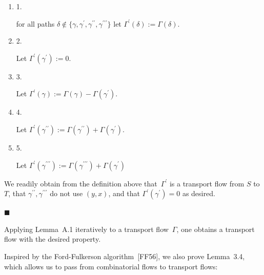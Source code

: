 \documentclass[10pt,a4paper]{article}
\begin{document}
\begin{enumerate}


\item[] 1. 


for all paths $\delta\notin\{\gamma,\gamma^{\prime},\gamma^{\prime\prime},\gamma^{\prime\prime\prime}\}$ let $\Gamma^{\prime}(\delta):=\Gamma(\delta)$.\par




\item[] 2. 


Let $\Gamma^{\prime}(\gamma^{\prime}):=0$.\par




\item[] 3. 


Let $\Gamma^{\prime}(\gamma):=\Gamma(\gamma)-\Gamma(\gamma^{\prime})$.\par




\item[] 4. 


Let $\Gamma^{\prime}(\gamma^{\prime\prime}):=\Gamma(\gamma^{\prime\prime})+\Gamma(\gamma^{\prime})$.\par




\item[] 5. 


Let $\Gamma^{\prime}(\gamma^{\prime\prime\prime}):=\Gamma(\gamma^{\prime\prime\prime})+\Gamma(\gamma^{\prime})$\par




\end{enumerate}


We readily obtain from the definition above that $\Gamma^{\prime}$ is a transport flow from $S$ to $T$, that $\gamma^{\prime\prime},\gamma^{\prime\prime\prime}$ do not use $(y,x)$, and that $\Gamma^{\prime}(\gamma^{\prime})=0$ as desired.\par




\ensuremath{\blacksquare}\par





Applying Lemma A.1 iteratively to a transport flow $\Gamma$, one obtains a transport flow with the desired property.\par




Inspired by the Ford-Fulkerson algorithm [FF56], we also prove Lemma 3.4, which allows us to pass from combinatorial flows to transport flows:\par
\end{document}
